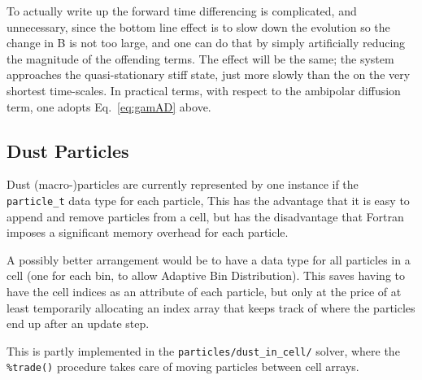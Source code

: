 \documentclass[paper=a4,fontsize=11pt]{scrartcl}
\numberwithin{equation}{section}		%
\numberwithin{figure}{section}			%
\numberwithin{table}{section}				%
\newcommand{\codecolor}{\color{Blue}}
\newcommand{\Code}[1]{{\codecolor\texttt{#1}}}
\begin{document}
To actually write up the forward time differencing is complicated, and unnecessary, since the bottom line effect is to slow down the evolution so the change in B is not too large, and one can do that by simply artificially reducing the magnitude of the offending terms.  The effect will be the same; the system approaches the quasi-stationary stiff state, just more slowly than the on the very shortest time-scales.  In practical terms, with respect to the ambipolar diffusion term, one adopts Eq.\ \ref{eq:gamAD} above.
    
\subsection{Dust Particles}
Dust (macro-)particles are currently represented by one instance if the \Code{particle\_t} data type for each particle,  This has the advantage that it is easy to append and remove particles from a cell, but has the disadvantage that Fortran imposes a significant memory overhead for each particle.

A possibly better arrangement would be to have a data type for all particles in a cell (one for each bin, to allow Adaptive Bin Distribution).  This saves having to have the cell indices as an attribute of each particle, but only at the price of at least temporarily allocating an index array that keeps track of where the particles end up after an update step.

This is partly implemented in the \Code{particles/dust\_in\_cell/} solver, where the \Code{\%trade()} procedure takes care of moving particles between cell arrays.

\end{document}
